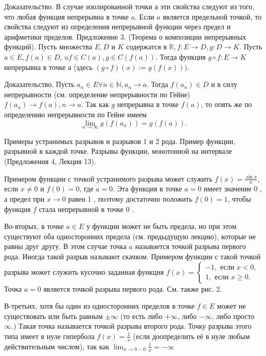 Доказательство. В случае изолированной точки $а$ эти свойства следуют из того, что любая функция непрерывна в точке $a$. Если $a$ является предельной точкой, то свойства следуют из определения непрерывной функции через предел и арифметики пределов.
Предложение 3. (Теорема о композиции непрерывных функций). Пусть множества $E, D$ и $K$ содержатся в $\mathbb{R}, f: E \rightarrow D, g: D \rightarrow K$. Пусть $a \in E, f(a) \in D$, $u f \in C(a), g \in C(f(a))$. Тогда функция $g \circ f: E \rightarrow K$ непрерывна в точке а (здесь $(g \circ f)(x):=g(f(x)))$.

Доказательство. Пусть $a_n \in E \forall n \in \mathbb{N}, a_n \rightarrow a$. Тогда $f\left(a_n\right) \in D$ и в силу непрерывности (см. определение непрерывности по Гейне) $f\left(a_n\right) \rightarrow f(a), n \rightarrow a$. Так как $g$ непрерывна в точке $f(a)$, то опять же по определению непрерывности по Гейне имеем
$$
\lim _{n \rightarrow \infty} g\left(f\left(a_n\right)\right)=g(f(a)) .
$$

\newpage
\begin{problem}
Примеры устранимых разрывов и разрывов 1 и 2 рода. Пример функции, разрывной в
каждой точке. Разрывы функции, монотонной на интервале (Предложения 4, Лекция 13).
\end{problem}
Примером функции с точкой устранимого разрыва может служить $f(x)=\frac{\sin x}{x}$, если $x \neq 0$ и $f(0)=0$, где $a=0$. Эта функция в точке $a=0$ имеет значение 0 , а предел при $x \rightarrow 0$ равен 1 , поэтому достаточно положить $f(0)=1$, чтобы функция $f$ стала непрерывной в точке 0 .

Во-вторых, в точке $a \in E$ у функции может не быть предела, но при этом существуют оба односторонних предела (см. предыдущую лекцию), которые не равны друг другу. В этом случае точка $a$ называется точкой разрыва первого рода. Иногда такой разрыв называют скачком. Примером функции с такой точкой разрыва может служить кусочно заданная функция $f(x)=\left\{\begin{array}{l}-1, \text { если } x<0, \\ 1, \text { если } x \geq 0 .\end{array}\right.$ Точка $a=0$ является точкой разрыва первого рода. См. также рис. 2.

В-третьих, хотя бы один из односторонних пределов в точке $f \in E$ может не существовать или быть равным $\pm \infty$ (то есть либо $+\infty$, либо $-\infty$, либо просто $\infty$.) Такая точка называется точкой разрыва второго рода. Точку разрыва этого типа имеет в нуле гипербола $f(x)=\frac{1}{x}$ (если доопределить её в нуле любым действительным числом), так как $\lim _{x \rightarrow 0-0} \frac{1}{x}=-\infty$

